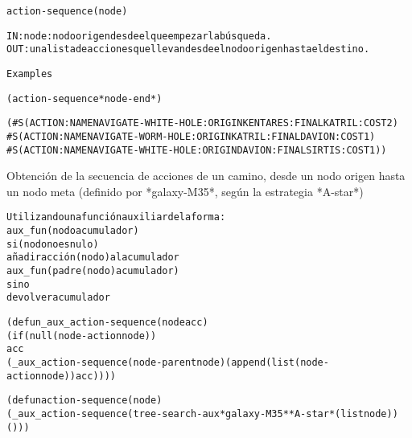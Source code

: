 \begin{aibox}{\function}
\begin{alltt}
action-sequence (node)


IN:  node: nodo origen desde el que empezar la búsqueda.
OUT: una lista de acciones que llevan desde el nodo origen hasta el destino.

\end{alltt}
\end{aibox}

\begin{aibox}{\examples}
\begin{alltt}
Examples

(action-sequence *node-end*)

(\#S(ACTION :NAME NAVIGATE-WHITE-HOLE :ORIGIN KENTARES :FINAL KATRIL :COST 2)
 \#S(ACTION :NAME NAVIGATE-WORM-HOLE :ORIGIN KATRIL :FINAL DAVION :COST 1)
 \#S(ACTION :NAME NAVIGATE-WHITE-HOLE :ORIGIN DAVION :FINAL SIRTIS :COST 1))

\end{alltt}
\end{aibox}

\begin{aibox}{\comments}
Obtención de la secuencia de acciones de un camino, desde un nodo origen hasta un nodo meta
    (definido por *galaxy-M35*, según la estrategia *A-star*)


\end{aibox}

\begin{aibox}{\pseudocode}
\begin{alltt}
Utilizando una función auxiliar de la forma:
aux\_fun (nodo acumulador)
       si (nodo no es nulo)
           añadir acción(nodo) al acumulador
           aux\_fun(padre(nodo) acumulador)
       sino
           devolver acumulador

\end{alltt}
\end{aibox}

\begin{aibox}{\code}
\begin{alltt}
(defun  \_aux\_action-sequence (node acc)
    (if (null (node-action node))
        acc
        (\_aux\_action-sequence (node-parent node) (append (list (node-action node)) acc))))

(defun action-sequence (node)
    (\_aux\_action-sequence (tree-search-aux *galaxy-M35* *A-star* (list node)) ()))




\end{alltt}
\end{aibox}
